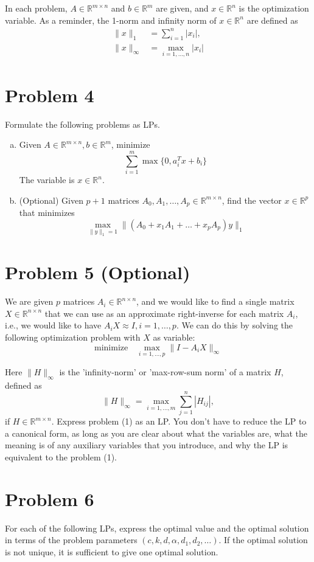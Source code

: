 \documentclass{article}
\begin{document}
In each problem, $A \in \mathbb{R}^{m\times n}$ and $b \in \mathbb{R}^m$ are given, and $x \in \mathbb{R}^n$ is the optimization variable. As a reminder, the 1-norm and infinity norm of $x \in \mathbb{R}^n$ are defined as
\begin{align*}
\|x\|_1 &= \sum_{i=1}^n |x_i|, \\
\|x\|_\infty &= \max_{i=1,\ldots,n} |x_i|
\end{align*}

\section{Problem 4}
Formulate the following problems as LPs.
\begin{enumerate}[(a)]
\item Given $A \in \mathbb{R}^{m\times n}, b \in \mathbb{R}^m$, minimize
\[\sum_{i=1}^m \max\{0, a_i^T x + b_i\}\]
The variable is $x \in \mathbb{R}^n$.
\item (Optional) Given $p+1$ matrices $A_0, A_1, \ldots, A_p \in \mathbb{R}^{m\times n}$, find the vector $x \in \mathbb{R}^p$ that minimizes
\[\max_{\|y\|_1=1} \|(A_0 + x_1A_1 + \ldots + x_pA_p)y\|_1\]
\end{enumerate}

\section{Problem 5 (Optional)}
We are given $p$ matrices $A_i \in \mathbb{R}^{n\times n}$, and we would like to find a single matrix $X \in \mathbb{R}^{n\times n}$ that we can use as an approximate right-inverse for each matrix $A_i$, i.e., we would like to have $A_iX \approx I, i = 1,\ldots,p$. We can do this by solving the following optimization problem with $X$ as variable:
\begin{equation}
\text{minimize} \quad \max_{i=1,\ldots,p} \|I - A_iX\|_\infty
\end{equation}

Here $\|H\|_\infty$ is the 'infinity-norm' or 'max-row-sum norm' of a matrix $H$, defined as
\[\|H\|_\infty = \max_{i=1,\ldots,m} \sum_{j=1}^n |H_{ij}|,\]
if $H \in \mathbb{R}^{m\times n}$. Express problem (1) as an LP. You don't have to reduce the LP to a canonical form, as long as you are clear about what the variables are, what the meaning is of any auxiliary variables that you introduce, and why the LP is equivalent to the problem (1).

\section{Problem 6}
For each of the following LPs, express the optimal value and the optimal solution in terms of the problem parameters $(c,k,d,\alpha,d_1,d_2,\ldots)$. If the optimal solution is not unique, it is sufficient to give one optimal solution.
\end{document}
